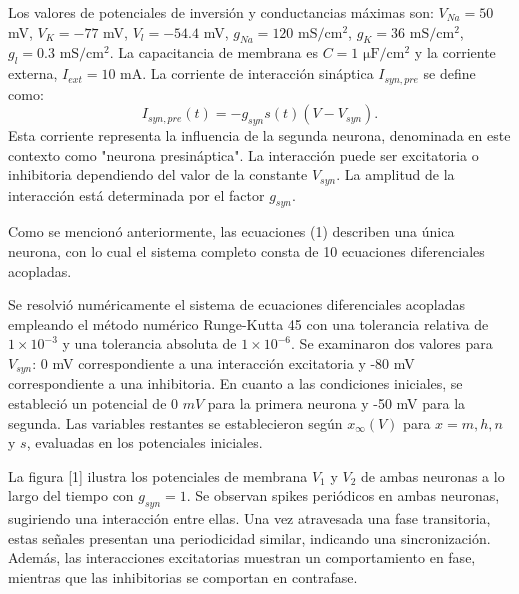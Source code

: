 \documentclass[aps,prb,twocolumn,superscriptaddress,floatfix,longbibliography]{revtex4-2}
\newcounter{para}
\begin{document}
Los valores de potenciales de inversión y conductancias máximas son: $V_{Na} = 50$ mV, $V_K = -77$ mV, $V_l = -54.4$ mV, $g_{Na} = 120$ $\mathrm{mS/cm^2}$, $g_K = 36$ $\mathrm{mS/cm^2}$, $g_l = 0.3$ $\mathrm{mS/cm^2}$. La capacitancia de membrana es $C = 1$ $\mathrm{\mu F/cm^2}$ y la corriente externa, $I_{ext} = 10$ mA. La corriente de interacción sináptica $I_{syn, pre}$ se define como:
\[I_{syn, pre}(t) = -g_{syn} s(t) (V - V_{syn}).\]
Esta corriente representa la influencia de la segunda neurona, denominada en este contexto como "neurona presináptica". La interacción puede ser excitatoria o inhibitoria dependiendo del valor de la constante $V_{syn}$. La amplitud de la interacción está determinada por el factor $g_{syn}$.

Como se mencionó anteriormente, las ecuaciones (1) describen una única neurona, con lo cual el sistema completo consta de 10 ecuaciones diferenciales acopladas.

Se resolvió numéricamente el sistema de ecuaciones diferenciales acopladas empleando el método numérico Runge-Kutta 45 con una tolerancia relativa de $1\times 10^{-3}$ y una tolerancia absoluta de $1 \times 10^{-6}$. Se examinaron dos valores para \(V_{syn}\): 0 mV correspondiente a una interacción excitatoria y -80 mV correspondiente a una inhibitoria. En cuanto a las condiciones iniciales, se estableció un potencial de 0 \(mV\) para la primera neurona y -50 mV para la segunda. Las variables restantes se establecieron según \(x_\infty(V)\) para \(x = m, h, n\) y \(s\), evaluadas en los potenciales iniciales.

La figura [1] ilustra los potenciales de membrana \(V_1\) y \(V_2\) de ambas neuronas a lo largo del tiempo con \(g_{syn} = 1\). Se observan spikes periódicos en ambas neuronas, sugiriendo una interacción entre ellas. Una vez atravesada una fase transitoria, estas señales presentan una periodicidad similar, indicando una sincronización. Además, las interacciones excitatorias muestran un comportamiento en fase, mientras que las inhibitorias se comportan en contrafase.
\end{document}
